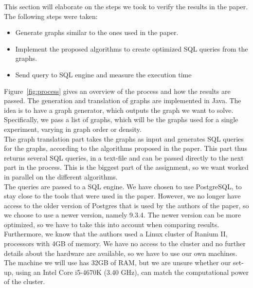 This section will elaborate on the steps we took to verify the results in the paper. The following steps were taken:

\begin{itemize}
	\item Generate graphs similar to the ones used in the paper.
	\item Implement the proposed algorithms to create optimized SQL queries from the graphs.
	\item Send query to SQL engine and measure the execution time
\end{itemize}

\noindent Figure~\ref{fig:process} gives an overview of the process and how the results are passed. The generation and translation of graphs are implemented in Java. The idea is to have a graph generator, which outputs the graph we want to solve. Specifically, we pass a list of graphs, which will be the graphs used for a single experiment, varying in graph order or density. \\

The graph translation part takes the graphs as input and generates SQL queries for the graphs, according to the algorithms proposed in the paper. This part thus returns several SQL queries, in a text-file and can be passed directly to the next part in the process. This is the biggest part of the assignment, so we want worked in parallel on the different algorithms. \\

The queries are passed to a SQL engine. We have chosen to use PostgreSQL, to stay close to the tools that were used in the paper. However, we no longer have access to the older version of Postgres that is used by the authors of the paper, so we choose to use a newer version, namely 9.3.4.
The newer version can be more optimized, so we have to take this into account when comparing results. Furthermore, we know that the authors used a Linux cluster of Itanium II, processors with 4GB of memory. We have no access to the cluster and no further details about the hardware are available, so we have to use our own machines. The machine we will use has 32GB of RAM, but we are unsure whether our set-up, using an Intel Core i5-4670K (3.40 GHz), can match the computational power of the cluster. 

